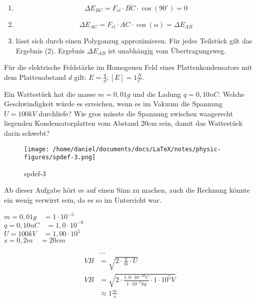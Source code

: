 \documentclass[a4paper]{report}
\begin{document}
\begin{enumerate}
  \item \[\Delta E_{BC}=F_{el} \cdot \overline{BC}\cdot \cos(90^{\circ})=0\]
  \item \[\Delta E_{AC}=F_{el} \cdot \overline{AC}\cdot \cos(\alpha)=\Delta E_{AB}\]
  \item l\"asst sich durch einen Polygonzug approximieren. F\"ur jedes Teilst\"uck gilt das Ergebnis (2). Ergebnis $\Delta E_{AB}$ ist unabh\"angig vom \"Ubertragungsweg.
\end{enumerate}


\begin{tcolorbox}[colback=red!10!white,colframe=red!80!black]
  F\"ur die elektrische Feldst\"arke im Homogenen Feld eines Plattenkondensators mit dem Plattenabstand $d$ gilt: $E=\frac{q}{d}; [E]=1\frac{N}{C}$.
\end{tcolorbox}


\begin{center}
\end{center}

\begin{tcolorbox}[colback=blue!10!white,colframe=blue!80!black]
  Ein Wattest\"uck hat die masse $m=0,01g$ und die Ladung $q=0,10nC$. Welche
  Geschwindigkeit w\"urde es erreichen, wenn es im Vakuum die Spannung
  $U=100kV$ durchliefe? Wie gros m\"usste die Spannung zwischen waagerecht
  liegenden Kondensatorplatten vom Abstand 20cm sein, damit das Wattest\"uck
  darin schwebt?
\end{tcolorbox}

\begin{figure}[htpb]
  \begin{center}
    \texttt{[image: /home/daniel/documents/docs/LaTeX/notes/physic-figures/spdef-3.png]}
  \end{center}
  \caption{spdef-3}
\end{figure}


Ab dieser Aufgabe h\"ort es auf einen Sinn zu machen, auch die Rechnung
k\"onnte ein wenig verwirrt sein, da es so im Unterricht war.

$m=0,01g \quad =1\cdot 10^{-5}$\\
$q=0,10nC\quad =1,0\cdot 10^{-8}$\\
$U=100kV \quad =1,00\cdot 10^{5}$\\
$s=0,2m  \quad =20cm$

\begin{align*}
  &\dots\\
  VB&=\sqrt{2\cdot \frac{q}{m}\cdot U}\\
  VB&=\sqrt{2\cdot \frac{1,0\cdot 10^{-10}C}{1\cdot 10^{-5}kg}\cdot 1 \cdot 10^5V}\\
  &\approx 1 \frac{m}{s}\\
\end{align*}
\end{document}
